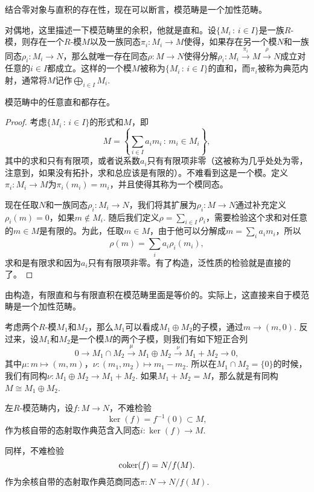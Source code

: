 结合零对象与直积的存在性，现在可以断言，模范畴是一个加性范畴。

\begin{para}[直和]
对偶地，这里描述一下模范畴里的余积，他就是直和。设$\{M_i\,:\, i\in I\}$是一族$R$-模，则存在一个$R$-模$M$以及一族同态$\pi_i:M_i\to M$使得，如果存在另一个模$N$和一族同态$\rho_i:M_i\to N$，那么就唯一存在同态$\rho:M\to N$使得分解$\rho_i:M_i\xrightarrow{\pi_i} M \xrightarrow{\rho} N$成立对任意的$i\in I$都成立。这样的一个模$M$被称为$\{M_i\,:\, i\in I\}$的直和，而$\pi_i$被称为典范内射，通常将$M$记作$\bigoplus_{i\in I}M_i$. 
\end{para}

\begin{pro}
	模范畴中的任意直和都存在。
\end{pro}

\begin{proof}
考虑$\{M_i\,:\, i\in I\}$的形式和$M$，即
\[
	M=\left\{\sum_{i\in I} a_i m_i\,:\, m_i\in M_i\right\},
\]
其中的求和只有有限项，或者说系数$a_i$只有有限项非零（这被称为几乎处处为零，注意到，如果没有拓扑，求和总应该是有限的）。不难看到这是一个模。定义$\pi_i:M_i\to M$为$\pi_i(m_i)=m_i$，并且使得其称为一个模同态。

现在任取$N$和一族同态$\rho_i:M_i\to N$，我们将其扩展为$\rho_i:M\to N$通过补充定义$\rho_i(m)=0$，如果$m\notin M_i$. 随后我们定义$\rho = \sum_{i\in I} \rho_i$，需要检验这个求和对任意的$m\in M$是有限的。为此，任取$m\in M$，由于他可以分解成$m=\sum_i a_i m_i$，所以
\[
	\rho(m)=\sum_i a_i \rho_i(m_i),
\]
求和是有限求和因为$a_i$只有有限项非零。有了构造，泛性质的检验就是直接的了。
\end{proof}

由构造，有限直和与有限直积在模范畴里面是等价的。实际上，这直接来自于模范畴是一个加性范畴。

\begin{para}
考虑两个$R$-模$M_1$和$M_2$，那么$M_1$可以看成$M_1\oplus M_2$的子模，通过$m\to (m,0)$. 反过来，设$M_1$和$M_2$是一个模$M$的两个子模，则我们有如下短正合列
\[
	0\to M_1\cap M_2 \xrightarrow{\mu} M_1\oplus M_2\xrightarrow{\nu} M_1+M_2\to 0,
\]
其中$\mu:m\mapsto (m,m)$，$\nu:(m_1,m_2)\mapsto m_1-m_2$. 所以在$M_1\cap M_2=\{0\}$的时候，我们有同构$\nu: M_1\oplus M_2\to M_1+M_2$. 如果$M_1+M_2=M$，那么就是有同构$M\cong M_1\oplus M_2$.
\end{para}


\begin{para}[核与余核]
左$R$-模范畴内，设$f:M\to N$，不难检验
\[
	\ker(f)=f^{-1}(0)\subset M,
\]
作为核自带的态射取作典范含入同态$i:\ker(f)\to M$.

同样，不难检验
\[
	\operatorname{coker}(f)=N/f(M).
\]
作为余核自带的态射取作典范商同态$\pi:N\to N/f(M)$.
\end{para}

